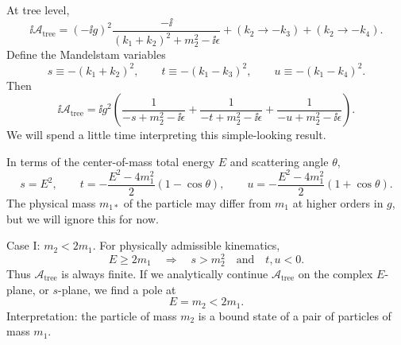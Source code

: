 \begin{center}
\end{center}

At tree level,
\[
  \ii\mathcal A_{\mathrm{tree}}
  =
  (-\ii g)^2
  \frac{-\ii}{(k_1+k_2)^2+m_2^2-\ii\epsilon}
  +(k_2\to-k_3)+(k_2\to-k_4).
\]
Define the Mandelstam variables
\[
  s\equiv-(k_1+k_2)^2,
  \qquad
  t\equiv-(k_1-k_3)^2,
  \qquad
  u\equiv-(k_1-k_4)^2.
\]
Then
\[
  \ii\mathcal A_{\mathrm{tree}}
  =
  \ii g^2\left(
    \frac{1}{-s+m_2^2-\ii\epsilon}
    +
    \frac{1}{-t+m_2^2-\ii\epsilon}
    +
    \frac{1}{-u+m_2^2-\ii\epsilon}
  \right).
\]
We will spend a little time interpreting this simple-looking result.

In terms of the center-of-mass total energy \(E\) and scattering angle
\(\theta\),
\[
  s=E^2,
  \qquad
  t=-\frac{E^2-4m_1^2}{2}(1-\cos\theta),
  \qquad
  u=-\frac{E^2-4m_1^2}{2}(1+\cos\theta).
\]
The physical mass \(m_{1*}\) of the particle may differ from \(m_1\) at
higher orders in \(g\), but we will ignore this for now.

Case I: \(m_2<2m_1\). For physically admissible kinematics,
\[
  E\geq 2m_1
  \quad\Longrightarrow\quad
  s>m_2^2
  \quad\text{and}\quad
  t,u<0.
\]
Thus \(\mathcal A_{\mathrm{tree}}\) is always finite. If we analytically
continue \(\mathcal A_{\mathrm{tree}}\) on the complex \(E\)-plane, or
\(s\)-plane, we find a pole at
\[
  E=m_2<2m_1.
\]
Interpretation: the particle of mass \(m_2\) is a bound state of a pair
of particles of mass \(m_1\).


